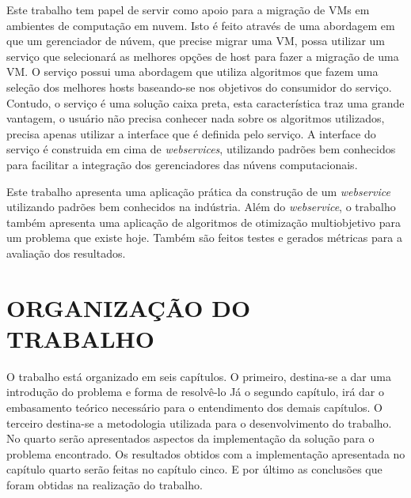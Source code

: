 Este trabalho tem papel de servir como apoio para a migração de VMs em ambientes de computação em nuvem. 
Isto é feito através de uma abordagem em que um gerenciador de núvem, que precise migrar uma VM, possa 
utilizar um serviço que selecionará as melhores opções de host para fazer a migração de uma VM. 
O serviço possui uma abordagem que utiliza algoritmos que fazem uma seleção dos melhores hosts baseando-se 
nos objetivos do consumidor do serviço. Contudo, o serviço é uma solução caixa preta, esta característica 
traz uma grande vantagem, o usuário não precisa conhecer nada sobre os algoritmos utilizados, 
precisa apenas utilizar a interface que é definida pelo serviço. A interface do serviço é construida
em cima de \textit{webservices}, utilizando padrões bem conhecidos para facilitar a integração dos gerenciadores
das núvens computacionais.

Este trabalho apresenta uma aplicação prática da construção de um \textit{webservice} utilizando padrões bem conhecidos
na indústria. Além do \textit{webservice}, o trabalho também apresenta uma aplicação de algoritmos de otimização multiobjetivo
para um problema que existe hoje. Também são feitos testes e gerados métricas para a avaliação dos resultados.

\section{ORGANIZAÇÃO DO TRABALHO}
\label{sec:organizacaoTrabalho}

O trabalho está organizado em seis capítulos. O primeiro, destina-se a dar uma introdução do problema e forma de resolvê-lo
Já o segundo capítulo, irá dar o embasamento teórico necessário para o entendimento dos demais capítulos.
O terceiro destina-se a metodologia utilizada para o desenvolvimento do trabalho. No quarto serão apresentados
aspectos da implementação da solução para o problema encontrado. Os resultados obtidos com a implementação
apresentada no capítulo quarto serão feitas no capítulo cinco. E por último as conclusões que foram obtidas
na realização do trabalho.
